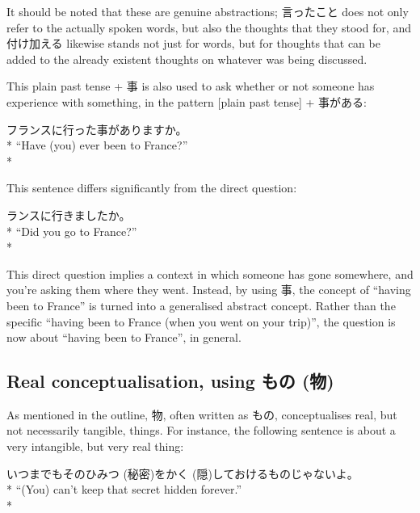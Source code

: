\documentclass[11pt, b5paper, twoside, openright, onecolumn]{book}
\makeatletter
\newcommand*{\rubystack}[2]{{\relscale{0.5}%
  \begin{tabular}[b]{@{}c@{}}%
    {#1}\\%
   {\textscale{2}{#2}}%
  \end{tabular}}%
}
\DeclareRobustCommand*{\ruby}[2]{%
  \mbox{%
    \setlength{\parskip}{0ex}%
    \BeginAccSupp{method=pdfstringdef,ActualText={#1}}%
      \rubystack{\phantom{#2}}{#1}%
      \llap{%
        \rubystack{#2}{\phantom{#1}}%
      }%
    \EndAccSupp{}%
  }%
}
\renewcommand*{\ruby}[2]{#2 (#1)}%
\newenvironment{exampleblock}{
\setlength{\parindent}{0.6in}
\begin{minipage}[t]{\dimexpr\textwidth-\parindent}}
{\end{minipage}}
\makeatother
\begin{document}
It should be noted that these are genuine abstractions; 言ったこと does not only refer to the actually spoken words‚ but also the thoughts that they stood for‚ and 付け加える likewise stands not just for words‚ but for thoughts that can be added to the already existent thoughts on whatever was being discussed.

This plain past tense + 事 is also used to ask whether or not someone has experience with something‚ in the pattern [plain past tense] + 事がある:

\vspace{0.4cm}
\begin{exampleblock}
フランスに行った事がありますか。 \\* 
“Have (you) ever been to France?” \\* 
\end{exampleblock}
\vspace{0.2cm}

This sentence differs significantly from the direct question:

\vspace{0.4cm}
\begin{exampleblock}
ランスに行きましたか。 \\* 
“Did you go to France?” \\* 
\end{exampleblock}
\vspace{0.2cm}

This direct question implies a context in which someone has gone somewhere‚ and you’re asking them where they went. Instead‚ by using 事‚ the concept of “having been to France” is turned into a generalised abstract concept. Rather than the specific “having been to France (when you went on your trip)”‚ the question is now about “having been to France”‚ in general.

\subsection{Real conceptualisation‚ using \ruby{物}{もの}}

As mentioned in the outline‚ 物‚ often written as もの‚ conceptualises real‚ but not necessarily tangible‚ things. For instance‚ the following sentence is about a very intangible‚ but very real thing:

\vspace{0.4cm}
\begin{exampleblock}
いつまでもその\ruby{秘密}{ひみつ}を\ruby{隠}{かく}しておけるものじゃないよ。 \\* 
“(You) can’t keep that secret hidden forever.” \\* 
\end{exampleblock}
\vspace{0.2cm}
\end{document}
